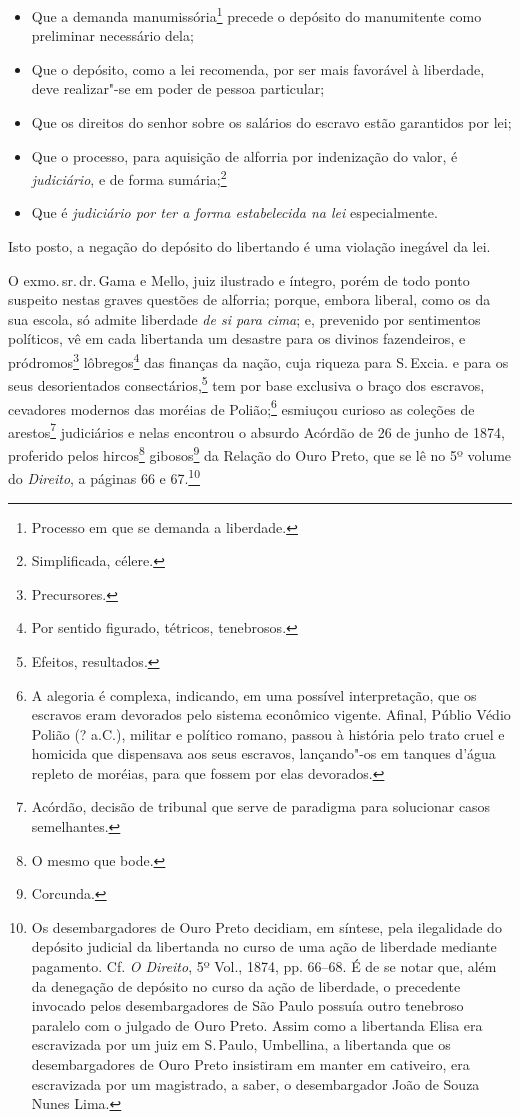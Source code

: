 \begin{itemize}
\item[] Que a demanda
manumissória\footnote{Processo em que se demanda a liberdade.} precede
o depósito do manumitente como preliminar necessário dela;

\item[] Que o depósito, como a lei recomenda, por ser mais favorável à
liberdade, deve realizar"-se em poder de pessoa particular;

\item[] Que os direitos do senhor sobre os salários do escravo estão garantidos
por lei;

\item[] Que o processo, para aquisição de alforria por indenização do valor, é
\emph{judiciário}, e de forma sumária;\footnote{Simplificada, célere.}

\item[] Que é \emph{judiciário por ter a forma estabelecida na lei}
especialmente.

\end{itemize}
Isto posto, a negação do depósito do libertando é uma violação inegável da lei.

O exmo.\,sr.\,dr.\,Gama e Mello, juiz ilustrado e íntegro, porém de todo
ponto suspeito nestas graves questões de alforria; porque, embora
liberal, como os da sua escola, só admite liberdade \emph{de si para
cima}; e, prevenido por sentimentos políticos, vê em cada libertanda um
desastre para os divinos fazendeiros, e pródromos\footnote{
  Precursores.} lôbregos\footnote{Por sentido figurado, tétricos,
  tenebrosos.} das finanças da nação, cuja riqueza para S.\,Excia. e para
os seus desorientados consectários,\footnote{Efeitos, resultados.} tem
por base exclusiva o braço dos escravos, cevadores modernos das moréias
de Polião;\footnote{A alegoria é complexa, indicando, em uma possível
  interpretação, que os escravos eram devorados pelo sistema econômico vigente.
  Afinal, Públio Védio Polião (? a.C.), militar e político romano,
  passou à história pelo trato cruel e homicida que dispensava aos seus
  escravos, lançando"-os em tanques d'água repleto de moréias, para que
  fossem por elas devorados.} esmiuçou curioso as coleções de
arestos\footnote{Acórdão, decisão de tribunal que serve de paradigma
  para solucionar casos semelhantes.} judiciários e nelas encontrou o
absurdo Acórdão de 26 de junho de 1874, proferido pelos hircos\footnote{
  O mesmo que bode.} gibosos\footnote{Corcunda.} da Relação do Ouro
Preto, que se lê no 5º volume do \emph{Direito}, a páginas 66 e
67.\footnote{Os desembargadores de Ouro Preto decidiam, em síntese,
  pela ilegalidade do depósito judicial da libertanda no curso de uma
  ação de liberdade mediante pagamento. Cf. \emph{O Direito}, 5º Vol.,
  1874, pp. 66--68. É de se notar que, além da denegação de depósito no
  curso da ação de liberdade, o precedente invocado pelos
  desembargadores de São Paulo possuía outro tenebroso paralelo com o
  julgado de Ouro Preto. Assim como a libertanda Elisa era escravizada
  por um juiz em S.\,Paulo, Umbellina, a libertanda que os
  desembargadores de Ouro Preto insistiram em manter em cativeiro, era
  escravizada por um magistrado, a saber, o desembargador João de Souza
  Nunes Lima.}

